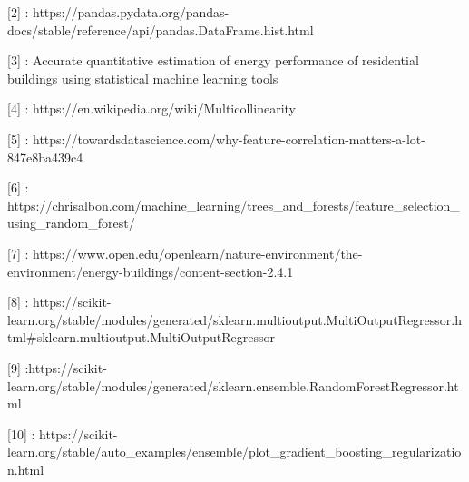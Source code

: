 \documentclass[11pt]{article}
\begin{document}
{[}2{]} :
https://pandas.pydata.org/pandas-docs/stable/reference/api/pandas.DataFrame.hist.html

{[}3{]} : Accurate quantitative estimation of energy performance of
residential buildings using statistical machine learning tools

{[}4{]} : https://en.wikipedia.org/wiki/Multicollinearity

{[}5{]} :
https://towardsdatascience.com/why-feature-correlation-matters-a-lot-847e8ba439c4

{[}6{]} :
https://chrisalbon.com/machine\_learning/trees\_and\_forests/feature\_selection\_using\_random\_forest/

{[}7{]} :
https://www.open.edu/openlearn/nature-environment/the-environment/energy-buildings/content-section-2.4.1

{[}8{]} :
https://scikit-learn.org/stable/modules/generated/sklearn.multioutput.MultiOutputRegressor.html\#sklearn.multioutput.MultiOutputRegressor

{[}9{]}
:https://scikit-learn.org/stable/modules/generated/sklearn.ensemble.RandomForestRegressor.html

{[}10{]} :
https://scikit-learn.org/stable/auto\_examples/ensemble/plot\_gradient\_boosting\_regularization.html


    
    
    
    
\end{document}
